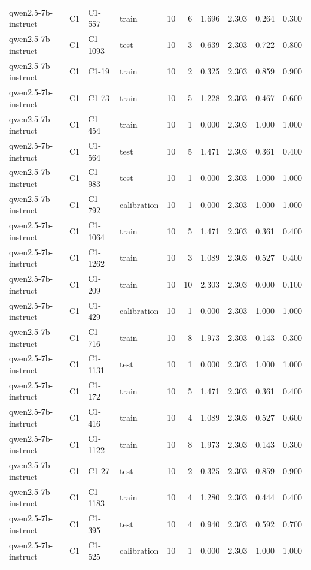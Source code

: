 \begin{table}
\begin{tabular}{llllrrrrrr}
qwen2.5-7b-instruct & C1 & C1-557 & train & 10 & 6 & 1.696 & 2.303 & 0.264 & 0.300 \\
qwen2.5-7b-instruct & C1 & C1-1093 & test & 10 & 3 & 0.639 & 2.303 & 0.722 & 0.800 \\
qwen2.5-7b-instruct & C1 & C1-19 & train & 10 & 2 & 0.325 & 2.303 & 0.859 & 0.900 \\
qwen2.5-7b-instruct & C1 & C1-73 & train & 10 & 5 & 1.228 & 2.303 & 0.467 & 0.600 \\
qwen2.5-7b-instruct & C1 & C1-454 & train & 10 & 1 & 0.000 & 2.303 & 1.000 & 1.000 \\
qwen2.5-7b-instruct & C1 & C1-564 & test & 10 & 5 & 1.471 & 2.303 & 0.361 & 0.400 \\
qwen2.5-7b-instruct & C1 & C1-983 & test & 10 & 1 & 0.000 & 2.303 & 1.000 & 1.000 \\
qwen2.5-7b-instruct & C1 & C1-792 & calibration & 10 & 1 & 0.000 & 2.303 & 1.000 & 1.000 \\
qwen2.5-7b-instruct & C1 & C1-1064 & train & 10 & 5 & 1.471 & 2.303 & 0.361 & 0.400 \\
qwen2.5-7b-instruct & C1 & C1-1262 & train & 10 & 3 & 1.089 & 2.303 & 0.527 & 0.400 \\
qwen2.5-7b-instruct & C1 & C1-209 & train & 10 & 10 & 2.303 & 2.303 & 0.000 & 0.100 \\
qwen2.5-7b-instruct & C1 & C1-429 & calibration & 10 & 1 & 0.000 & 2.303 & 1.000 & 1.000 \\
qwen2.5-7b-instruct & C1 & C1-716 & train & 10 & 8 & 1.973 & 2.303 & 0.143 & 0.300 \\
qwen2.5-7b-instruct & C1 & C1-1131 & test & 10 & 1 & 0.000 & 2.303 & 1.000 & 1.000 \\
qwen2.5-7b-instruct & C1 & C1-172 & train & 10 & 5 & 1.471 & 2.303 & 0.361 & 0.400 \\
qwen2.5-7b-instruct & C1 & C1-416 & train & 10 & 4 & 1.089 & 2.303 & 0.527 & 0.600 \\
qwen2.5-7b-instruct & C1 & C1-1122 & train & 10 & 8 & 1.973 & 2.303 & 0.143 & 0.300 \\
qwen2.5-7b-instruct & C1 & C1-27 & test & 10 & 2 & 0.325 & 2.303 & 0.859 & 0.900 \\
qwen2.5-7b-instruct & C1 & C1-1183 & train & 10 & 4 & 1.280 & 2.303 & 0.444 & 0.400 \\
qwen2.5-7b-instruct & C1 & C1-395 & test & 10 & 4 & 0.940 & 2.303 & 0.592 & 0.700 \\
qwen2.5-7b-instruct & C1 & C1-525 & calibration & 10 & 1 & 0.000 & 2.303 & 1.000 & 1.000 \\

\end{tabular}
\end{table}
